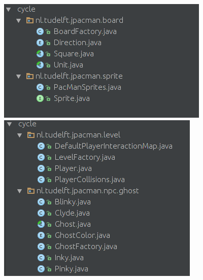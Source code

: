 \documentclass[12pt, openany]{report}
\begin{document}
\begin{figure}[!h]
	\centering
	\includegraphics[scale=0.5]{Images/DependencyCycle1.png}
	\includegraphics[scale=0.5]{Images/DependencyCycle2.png}  
	\label{DependencyCycle1}
\end{figure}
\end{document}
